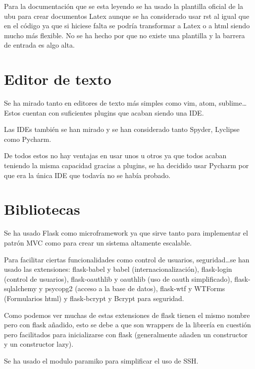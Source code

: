 Para la documentación que se esta leyendo se ha usado la plantilla oficial de la ubu para crear documentos Latex aunque se ha considerado usar rst al igual que en el código ya que si hiciese falta se podría transformar a Latex o a html siendo mucho más flexible. No se ha hecho por que no existe una plantilla y la barrera de entrada es algo alta.


\section{Editor de texto}

Se ha mirado tanto en editores de texto más simples como vim, atom, sublime\ldots Estos cuentan con suficientes plugins que acaban siendo una IDE.

Las IDEs también se han mirado y se han considerado tanto Spyder, Lyclipse como Pycharm.

De todos estos no hay ventajas en usar unos u otros ya que todos acaban teniendo la misma capacidad gracias a plugins, se ha decidido usar Pycharm por que era la única IDE que todavía no se había probado.


\section{Bibliotecas}

Se ha usado Flask como microframework ya que sirve tanto para implementar el patrón MVC como para crear un sistema altamente escalable. 

Para facilitar ciertas funcionalidades como control de usuarios, seguridad\ldots se han usado las extensiones: flask-babel y babel (internacionalización), flask-login (control de usuarios), flask-oauthlib y oauthlib (uso de oauth simplificado), flask-sqlalchemy y psycopg2 (acceso a la base de datos), flask-wtf y WTForms (Formularios html) y flask-bcrypt y Bcrypt para seguridad.

Como podemos ver muchas de estas extensiones de flask tienen el mismo nombre pero con flask añadido, esto se debe a que son wrappers de la librería en cuestión pero facilitados para inicializarse con flask (generalmente añaden un constructor y un constructor lazy).

Se ha usado el modulo paramiko para simplificar el uso de SSH.

